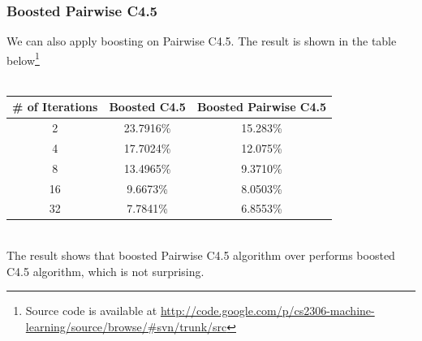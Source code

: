 \documentclass[a4paper,11pt]{article}
\begin{document}
\subsubsection{Boosted Pairwise C4.5}
We can also apply boosting on Pairwise C4.5. The result is shown in the table below\footnote{Source code is available at \url{http://code.google.com/p/cs2306-machine-learning/source/browse/#svn/trunk/src}}\\
\vspace{0.5cm}\\
\begin{tabular}{c c c}
\# of Iterations	& Boosted C4.5 & Boosted Pairwise C4.5\\
\hline \hline
	2		& 23.7916\% & 15.283\%  \\
	4		& 17.7024\% & 12.075\%  \\
	8		& 13.4965\% & 9.3710\%  \\
	16		& 9.6673\%  & 8.0503\%  \\
    32      & 7.7841\%  & 6.8553\%\\
\end{tabular}
\vspace{0.5cm}\\
The result shows that boosted Pairwise C4.5 algorithm over performs boosted C4.5 algorithm, which is not surprising.\\
\end{document}
